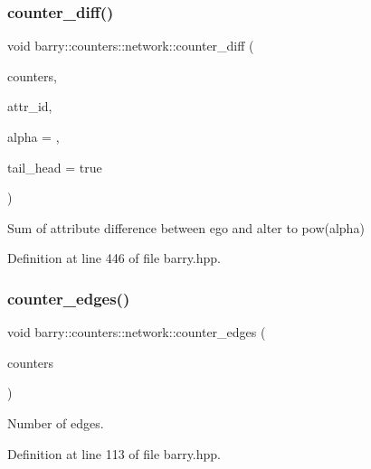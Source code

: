 \subsubsection{\texorpdfstring{counter\+\_\+diff()}{counter\_diff()}}
{\footnotesize\ttfamily void barry\+::counters\+::network\+::counter\+\_\+diff (\begin{DoxyParamCaption}\item[{\hyperlink{namespacebarry_1_1counters_1_1network_aa72fdb34752ac24167a06ee196a8fff6}{Net\+Counters} $\ast$}]{counters,  }\item[{\hyperlink{namespacebarry_a11dfc53ddb4672278319aa04f1e09a6c}{uint}}]{attr\+\_\+id,  }\item[{double}]{alpha = {},  }\item[{double}]{tail\+\_\+head = {\ttfamily true} }\end{DoxyParamCaption})\hspace{0.3cm}{\ttfamily [inline]}}



Sum of attribute difference between ego and alter to pow(alpha) 



Definition at line 446 of file barry.\+hpp.

\mbox{\label{namespacebarry_1_1counters_1_1network_ace52a65ee587dfe7b5e815de70350581}} 
\subsubsection{\texorpdfstring{counter\+\_\+edges()}{counter\_edges()}}
{\footnotesize\ttfamily void barry\+::counters\+::network\+::counter\+\_\+edges (\begin{DoxyParamCaption}\item[{\hyperlink{namespacebarry_1_1counters_1_1network_aa72fdb34752ac24167a06ee196a8fff6}{Net\+Counters} $\ast$}]{counters }\end{DoxyParamCaption})\hspace{0.3cm}{\ttfamily [inline]}}



Number of edges. 



Definition at line 113 of file barry.\+hpp.

